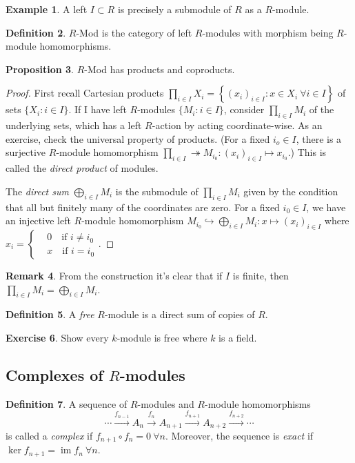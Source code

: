 \documentclass{article}
\newcommand{\im}{\operatorname{im}}
\theoremstyle{definition}
\newtheorem{defn}{Definition}[subsection]
\newtheorem{prop}[defn]{Proposition}
\newtheorem{example}[defn]{Example}
\newtheorem{exe}[defn]{Exercise}
\newtheorem{remark}[defn]{Remark}
\begin{document}
\begin{example}
A left $I\subset R$ is precisely a submodule of $R$ as a $R$-module.
\end{example}

\begin{defn}
$R$-Mod is the category of left $R$-modules with morphism being $R$-module homomorphisms.
\end{defn}

\begin{prop}
$R$-Mod has products and coproducts.
\end{prop}
\begin{proof}
First recall Cartesian products $\prod_{i\in I}X_i=\left\{(x_i)_{i\in I}:x\in X_i \ \forall i\in I\right\}$ of sets $\{X_i:i\in I\}$. If I have left $R$-modules $\{M_i:i\in I\}$, consider $\prod_{i\in I}M_i$ of the underlying sets, which has a left $R$-action by acting coordinate-wise. As an exercise, check the universal property of products. (For a fixed $i_o\in I$, there is a surjective $R$-module homomorphism $\prod_{i\in I}\twoheadrightarrow M_{i_0}:(x_i)_{i\in I}\mapsto x_{i_0}$.) This is called the \textit{direct product} of modules.

The \textit{direct sum} $\bigoplus_{i\in I}M_i$ is the submodule of $\prod_{i\in I}M_i$ given by the condition that all but finitely many of the coordinates are zero. For a fixed $i_0\in I$, we have an injective left $R$-module homomorphism $M_{i_0}\hookrightarrow\bigoplus_{i\in I}M_i:x\mapsto (x_i)_{i\in I}$ where $x_i=\left\{\begin{aligned}
&0 \quad\text{if }i\neq i_0\\
&x \quad\text{if }i=i_0
\end{aligned} \right.$.
\end{proof}

\begin{remark}
From the construction it's clear that if $I$ is finite, then $\prod_{i\in I}M_i=\bigoplus_{i\in I}M_i$.
\end{remark}

\begin{defn}
A \textit{free} $R$-module is a direct sum of copies of $R$.
\end{defn}

\begin{exe}
Show every $k$-module is free where $k$ is a field.
\end{exe}


\subsection{Complexes of $R$-modules}
\begin{defn}
A sequence of $R$-modules and $R$-module homomorphisms
\[
\cdots\xrightarrow{f_{n-1}}A_n\xrightarrow{f_n}A_{n+1}\xrightarrow{f_{n+1}}A_{n+2}\xrightarrow{f_{n+2}}\cdots
\]
is called a \textit{complex} if $f_{n+1}\circ f_n=0 \ \forall n$. Moreover, the sequence is \textit{exact} if $\ker f_{n+1}=\im f_n \ \forall n$.
\end{defn}
\end{document}
